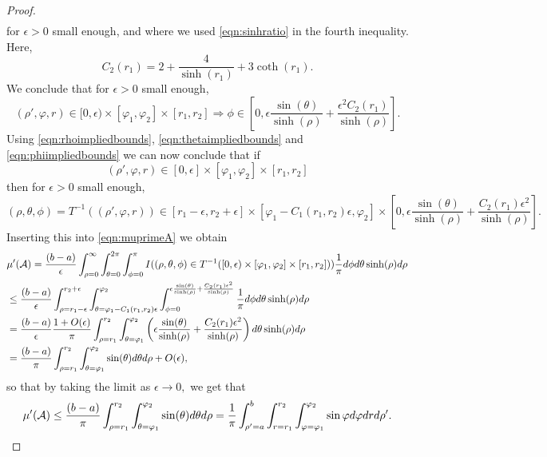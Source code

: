 \documentclass[10pt,a4paper]{amsart}
\newcommand{\CA}{{\mathcal{A}}}
\newcommand{\dd}{{\rm d}}
\begin{document}
\begin{proof}
\begin{align*}
\end{align*}
for $\epsilon>0$ small enough, and where we used \eqref{eqn:sinhratio} in the fourth inequality.
Here, 
\[
C_2(r_1)=2+\frac{4}{\sinh(r_1)}+3\coth(r_1).
\]
We conclude that for $\epsilon>0$ small enough,
\begin{equation} \label{eqn:phiimpliedbounds}
(\rho',\varphi,r)\in[0,\epsilon)\times [\varphi_1,\varphi_2] \times [r_1,r_2]  
\Rightarrow 
\phi\in\left[0,\epsilon\frac{\sin(\theta)}{\sinh(\rho)}+\frac{\epsilon^2C_2(r_1)}{\sinh(\rho)}\right].  
\end{equation}
Using \eqref{eqn:rhoimpliedbounds}, \eqref{eqn:thetaimpliedbounds} and 
\eqref{eqn:phiimpliedbounds} we can now conclude that if
\[
(\rho',\varphi,r)\in [0,\epsilon] \times [\varphi_1,\varphi_2]\times [r_1,r_2]  
\]
then for $\epsilon>0$ small enough,
\[
(\rho,\theta,\phi) =T^{-1}((\rho',\varphi,r)) 
\in [r_1-\epsilon,r_2+\epsilon]\times [\varphi_1-C_1(r_1,r_2)\epsilon,\varphi_2] 
\times \left[0,\epsilon\frac{\sin(\theta)}{\sinh(\rho)} 
+\frac{C_2(r_1)\epsilon^{2}}{\sinh(\rho)} \right]. \nonumber
\]
Inserting this into \eqref{eqn:muprimeA} we obtain
\begin{align*}
& \mu'(\CA) 
=\frac{(b-a)}{\epsilon}
\int_{\rho=0}^\infty  \int_{\theta=0}^{2 \pi} \int_{\phi=0}^{\pi} 
I((\rho,\theta,\phi)\in T^{-1}([0,\epsilon) \times [\varphi_1,\varphi_2]\times [r_1,r_2] )) 
\frac{1}{\pi}\dd \phi \dd \theta \sinh(\rho) \dd \rho \nonumber \\
& \leq \frac{(b-a)}{\epsilon}
\int_{\rho=r_1-\epsilon}^{r_2+\epsilon}  \int_{\theta=\varphi_1-C_1(r_1,r_2)\epsilon}^{\varphi_2}  
\int_{\phi=0}^{\epsilon\frac{\sin(\theta)}{\sinh(\rho)} +\frac{C_2(r_1)\epsilon^2}{\sinh(\rho)} } 
\frac{1}{\pi}\dd \phi \dd \theta \sinh(\rho) \dd \rho \nonumber \\
& =\frac{(b-a)}{\epsilon}\frac{1+O(\epsilon)}{\pi}
\int_{\rho=r_1}^{r_2}  \int_{\theta=\varphi_1}^{\varphi_2}  
\left(\epsilon\frac{\sin(\theta)}{\sinh(\rho)} +\frac{C_2(r_1)\epsilon^2}{\sinh(\rho)}  \right)
\dd \theta \sinh(\rho) \dd \rho \nonumber \\
& =\frac{(b-a)}{\pi}\int_{\rho=r_1}^{r_2}  \int_{\theta=\varphi_1}^{\varphi_2}  \sin(\theta) \dd \theta \dd \rho 
+O(\epsilon), \nonumber
\end{align*}
so that by taking the limit as $\epsilon\to 0,$ 
we get that 
\begin{equation} \label{eqn:muprimeAupper}
\mu'(\CA)\leq \frac{(b-a)}{\pi}\int_{\rho=r_1}^{r_2}  
\int_{\theta=\varphi_1}^{\varphi_2} 
\sin(\theta) \dd \theta \dd \rho 
=\frac{1}{\pi}\int_{\rho'=a}^b \int_{r=r_1}^{r_2} 
\int_{\varphi=\varphi_1}^{\varphi_2} 
\sin \varphi \dd \varphi \dd r \dd \rho'.    
\end{equation}



\end{proof}
\end{document}
